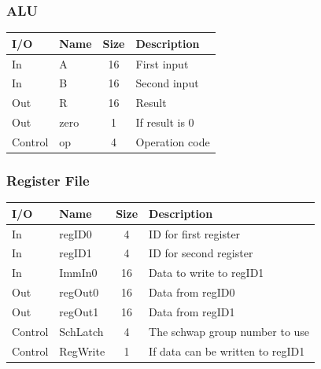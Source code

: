 \documentclass{article}
\begin{document}
		\subsubsection{ALU}
			\begin{center} \begin{tabular}{| l | l | c | l |} \hline 
				I/O & Name     & Size & Description \\ \hline 
				In  & A        & 16   & First input \\ \hline
				In  & B        & 16   & Second input \\ \hline
				Out & R        & 16   & Result \\ \hline
				Out & zero     & 1    & If result is 0 \\ \hline
				Control & op   & 4    & Operation code \\ \hline
			\end{tabular} \end{center}
		\subsubsection{Register File}
			\begin{center} \begin{tabular}{| l | l | c | l |} \hline
				I/O & Name       & Size & Description \\ \hline 
				In  & regID0     & 4    & ID for first register \\ \hline
				In  & regID1     & 4    & ID for second register \\ \hline
				In  & ImmIn0     & 16   & Data to write to regID1 \\ \hline
				Out & regOut0    & 16   & Data from regID0 \\ \hline
				Out & regOut1    & 16   & Data from regID1 \\ \hline
				Control & SchLatch & 4  & The schwap group number to use\\ \hline
				Control & RegWrite & 1  & If data can be written to regID1\\ \hline
			\end{tabular} \end{center}
\end{document}
